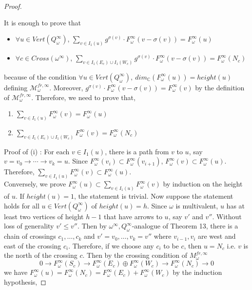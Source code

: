 \begin{proof}
\begin{itemize}
\end{itemize}
It is enough to prove that
\begin{itemize}
\item $\forall u \in Vert(Q_\omega^\infty)$, $\sum_{v\in I_1(u)} g^{\sigma(v)}\cdot F_\omega^\infty(v-\sigma(v)) = F_\omega^\infty(u)$
\item $\forall c \in Cross(\omega ^\infty)$, $\sum_{v\in I_1(E_c)\cup I_1(W_c)} g^{\sigma(v)}\cdot F_\omega^\infty(v-\sigma(v)) = F_\omega^\infty(N_c)$
\end{itemize} 
because of the condition $\forall u\in Vert(Q_\omega^\infty),~dim_\mathbb{C}(F_\omega^\infty(u)) = height(u)$ defining $\mathcal{M}_\omega^{fr,\infty}$. Moreover, $g^{\sigma(v)}\cdot F_\omega^\infty(v-\sigma(v)) = F_\omega^\infty(v)$ by the definition of $\mathcal{M}_\omega^{fr,\infty}$. Therefore, we need to prove that, 
\begin{enumerate}[label=(\roman*)]
\item $\sum_{v\in I_1(u)} F_\omega^\infty(v)=F_\omega^\infty(u)$
\item $\sum_{v\in I_1(E_c)\cup I_1(W_c)} F_\omega^\infty(v)=F_\omega^\infty(N_c)$
\end{enumerate}
Proof of (\Rn{1}) : For each $v\in I_1(u)$, there is a path from $v$ to $u$, say $v=v_0 \rightarrow \cdots \rightarrow v_k = u$. Since $F_\omega^\infty(v_i)\subset F_\omega^\infty(v_{i+1})$, $F_\omega^\infty(v)\subset F_\omega^\infty(u)$. Therefore, $\sum_{v\in I_1(u)} F_\omega^\infty(v) \subset F_\omega^\infty(u)$. \\
Conversely, we prove $F_\omega^\infty(u)\subset \sum_{v\in I_1(u)}F_\omega^\infty(v)$ by induction on the height of $u$. If $height(u)=1$, the statement is trivial. Now suppose the statement holds for all $u\in Vert(Q_\omega^\infty)$ of $height(u) = h$. Since $\omega$ is multivalent, $u$ has at least two vertices of height $h-1$ that have arrows to $u$, say $v'$ and $v''$. Without loss of generality $v'\leq v''$. Then by $\omega^\infty, Q_\omega^\infty$-analogue of Theorem 13, there is a chain of crossings $c_1,\dots,c_k$ and $v'=v_0,\dots,v_k=v''$ where $v_{i-1},v_i$ are west and east of the crossing $c_i$. Therefore, if we choose any $c_i$ to be $c$, then $u=N_c$ i.e. $v$ is the north of the crossing $c$. Then by the crossing condition of $M_\omega^{fr,\infty}$
\[
0\rightarrow F_\omega^\infty(S_c)\rightarrow F_\omega^\infty(E_c)\oplus F_\omega^\infty(W_c)\rightarrow F_\omega^\infty(N_c)\rightarrow 0
\]
we have $F_\omega^\infty(u) = F_\omega^\infty(N_c)=F_\omega^\infty(E_c)+F_\omega^\infty(W_c)$ by the induction hypothesis,

\end{proof}
